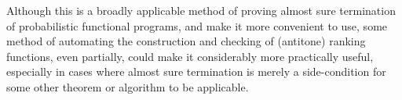 Although this is a broadly applicable method of proving almost sure termination of probabilistic functional programs, and  make it more convenient to use, some method of automating the construction and checking of (antitone) ranking functions, even partially, could make it considerably more practically useful, especially in cases where almost sure termination is merely a side-condition for some other theorem or algorithm to be applicable.
